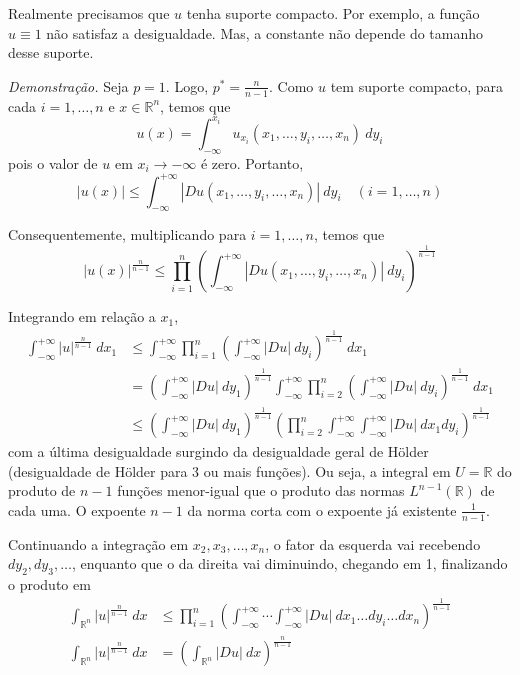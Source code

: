 \documentclass[11pt]{article}
\newcommand{\R}{\mathbb{R}}
\newcommand{\Rn}{{\mathbb{R}^n}}
\begin{document}
Realmente precisamos que $u$ tenha suporte compacto. Por exemplo, a função $u \equiv 1$ não satisfaz a desigualdade. Mas, a constante não depende do tamanho desse suporte.

\textit{Demonstração.} Seja $p=1$. Logo, $p^* = \frac{n}{n-1}$. Como $u$ tem suporte compacto, para cada $i=1,\ldots,n$ e $x \in \Rn$, temos que \[ u(x) = \int_{-\infty}^{x_i} u_{x_i}(x_1, \ldots, y_i, \ldots, x_n) \ dy_i\] pois o valor de $u$ em $x_i \rightarrow -\infty$ é zero. Portanto, \[ |u(x)| \leq \int_{-\infty}^{+\infty} \left| Du(x_1, \ldots, y_i, \ldots, x_n) \right|\ dy_i \quad (i=1, \ldots, n)\]

Consequentemente, multiplicando para $i=1, \ldots, n$, temos que \[ |u(x)|^{\frac{n}{n-1}} \leq \prod_{i=1}^{n} \left( \int_{-\infty}^{+\infty} |Du(x_1, \ldots, y_i, \ldots, x_n)| \ dy_i \right)^{\frac{1}{n-1}}  \]

Integrando em relação a $x_1$, \begin{align*}
	\int_{-\infty}^{+\infty} |u|^{\frac{n}{n-1}}\ dx_1 &\leq \int_{-\infty}^{+\infty} \prod_{i=1}^{n} \left( \int_{-\infty}^{+\infty} |Du|\ dy_i \right)^{\frac{1}{n-1}}\ dx_1 \\
	&= \left( \int_{-\infty}^{+\infty} |Du|\ dy_1 \right)^{\frac{1}{n-1}} \int_{-\infty}^{+\infty} \prod_{i=2}^{n} \left( \int_{-\infty}^{+\infty} |Du|\ dy_i \right)^{\frac{1}{n-1}}\ dx_1 \\
	&\leq \left( \int_{-\infty}^{+\infty} |Du|\ dy_1 \right)^{\frac{1}{n-1}}  \left( \prod_{i=2}^{n} \int_{-\infty}^{+\infty} \int_{-\infty}^{+\infty} |Du|\ dx_1 dy_i \right)^{\frac{1}{n-1}} 
\end{align*} com a última desigualdade surgindo da desigualdade geral de Hölder (desigualdade de Hölder para 3 ou mais funções). Ou seja, a integral em $U=\R$ do produto de $n-1$ funções menor-igual que o produto das normas $L^{n-1}(\R)$  de cada uma. O expoente $n-1$ da norma corta com o expoente já existente \( \frac{1}{n-1} \).

Continuando a integração em $x_2, x_3, \ldots, x_n$, o fator da esquerda vai recebendo $dy_2, dy_3, \ldots$, enquanto que o da direita vai diminuindo, chegando em 1, finalizando o produto em \begin{align*}
	\int_\Rn |u|^{\frac{n}{n-1}}\ dx &\leq \prod_{i=1}^{n} \left(  \int_{-\infty}^{+\infty} \cdots \int_{-\infty}^{+\infty} |Du|\ dx_1 \ldots dy_i \ldots dx_n \right)^{\frac{1}{n-1}}\\
		\int_\Rn |u|^{\frac{n}{n-1}}\ dx &= \left( \int_{\Rn} |Du|\ dx \right)^{\frac{n}{n-1}}
\end{align*}  
\end{document}
